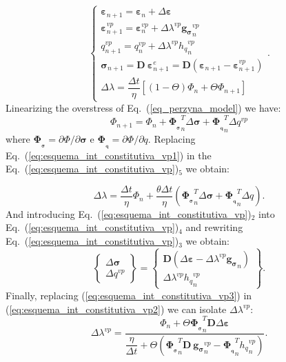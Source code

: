 \documentclass[Journal,letterpaper]{ascelike-new}
\newcommand{\Dsdee}{\boldsymbol{D}}
\newcommand{\hl}{{h_q}}
\newcommand{\dPhidsl}{\boldsymbol{\Phi_{_\sigma}}}
\newcommand{\dPhidql}{\boldsymbol{\Phi_{_q}}}
\newcommand{\dgds}{\boldsymbol{g_\sigma}}
\newcommand{\strain}{\boldsymbol{\varepsilon}}
\newcommand{\stress}{\boldsymbol{\sigma}}
\begin{document}
\begin{equation}
	\label{eq:esquema_int_constitutiva_vp}
	\left\{
	\begin{array}{lcl}
		\strain_{n+1} = \strain_n + \Delta \strain \\
		\strain_{n+1}^{vp} = \strain_n^{vp} + \Delta \lambda^{vp} \dgds_n^{vp} \\
		q_{n+1}^{vp} = q_n^{vp} + \Delta \lambda^{vp} \hl_n^{vp} \\	
		\stress_{n+1} = \Dsdee~\strain_{n+1}^e = \Dsdee(\strain_{n+1} - \strain_{n+1}^{vp}) \\
		\Delta \lambda = \dfrac{\Delta t}{\eta}[(1-\Theta)\Phi_n + \Theta \Phi_{n+1}]
	\end{array}
	\right..
\end{equation}
Linearizing the overstress of Eq.~(\ref{eq_perzyna_model}) we have:
\begin{equation}
	\label{eq:esquema_int_constitutiva_vp1}
	\Phi_{n+1} = \Phi_n + \dPhidsl_n^T \Delta \stress + \dPhidql_n^T \Delta q^{vp}
\end{equation}
where $\dPhidsl = \partial \Phi / \partial \stress$ e $\dPhidql = \partial \Phi / \partial q$. Replacing  Eq.~(\ref{eq:esquema_int_constitutiva_vp1}) in the Eq.~(\ref{eq:esquema_int_constitutiva_vp})$_5$ we obtain:

\begin{equation}
	\label{eq:esquema_int_constitutiva_vp2}
	\Delta \lambda = \dfrac{\Delta t}{\eta} \Phi_n + \dfrac{\theta \Delta t}{\eta}(\dPhidsl_n^T \Delta \stress + \dPhidql_n^T \Delta q).
\end{equation}
And introducing Eq.~(\ref{eq:esquema_int_constitutiva_vp})$_2$  into Eq.~(\ref{eq:esquema_int_constitutiva_vp})$_4$ and rewriting 
Eq.~(\ref{eq:esquema_int_constitutiva_vp})$_3$ we obtain:
\begin{equation}
	\label{eq:esquema_int_constitutiva_vp3}
	\left\{ \begin{array}{lcl} \Delta \stress \\ \Delta q^{vp} \end{array} \right\} = \left\{ \begin{array}{ccc} \Dsdee(\Delta\strain -\Delta \lambda^{vp} \dgds_n) \\ \Delta \lambda^{vp} \hl_n^{vp} \end{array} \right\}.
\end{equation}
Finally, replacing (\ref{eq:esquema_int_constitutiva_vp3}) in (\ref{eq:esquema_int_constitutiva_vp2}) we can isolate $\Delta \lambda^{vp}$:
\begin{equation}
	\label{eq:esquema_int_constitutiva_vp4}
	\Delta \lambda^{vp} = \dfrac{\Phi_n + \Theta \dPhidsl_n^T\Dsdee\Delta\strain}{\dfrac{\eta}{\Delta t} + \Theta (\dPhidsl_n^T\Dsdee~\dgds_n^{vp} - \dPhidql_n^T \hl_n^{vp})}.
\end{equation}
\end{document}
